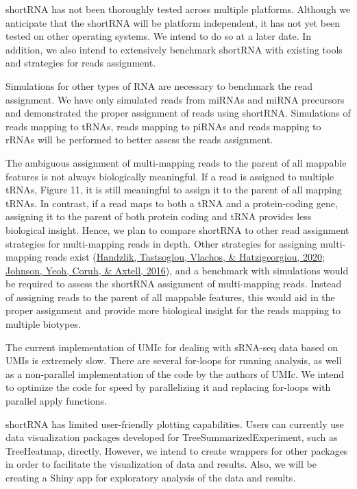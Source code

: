 \documentclass[12pt,twoside]{reedthesis}
\begin{document}
shortRNA has not been thoroughly tested across multiple platforms.
Although we anticipate that the shortRNA will be platform independent,
it has not yet been tested on other operating systems. We intend to do
so at a later date. In addition, we also intend to extensively benchmark
shortRNA with existing tools and strategies for reads assignment.

Simulations for other types of RNA are necessary to benchmark the read
assignment. We have only simulated reads from miRNAs and miRNA
precursors and demonstrated the proper assignment of reads using
shortRNA. Simulations of reads mapping to tRNAs, reads mapping to piRNAs
and reads mapping to rRNAs will be performed to better assess the reads
assignment.

The ambiguous assignment of multi-mapping reads to the parent of all
mappable features is not always biologically meaningful. If a read is
assigned to multiple tRNAs, Figure 11, it is still meaningful to assign
it to the parent of all mapping tRNAs. In contrast, if a read maps to
both a tRNA and a protein-coding gene, assigning it to the parent of
both protein coding and tRNA provides less biological insight. Hence, we
plan to compare shortRNA to other read assignment strategies for
multi-mapping reads in depth. Other strategies for assigning
multi-mapping reads exist (\protect\hyperlink{ref-handzlik2020}{Handzlik, Tastsoglou, Vlachos, \& Hatzigeorgiou, 2020}; \protect\hyperlink{ref-johnson2016}{Johnson, Yeoh, Coruh, \& Axtell, 2016}), and a benchmark
with simulations would be required to assess the shortRNA assignment of
multi-mapping reads. Instead of assigning reads to the parent of all
mappable features, this would aid in the proper assignment and provide
more biological insight for the reads mapping to multiple biotypes.

The current implementation of UMIc for dealing with sRNA-seq data based
on UMIs is extremely slow. There are several for-loops for running
analysis, as well as a non-parallel implementation of the code by the
authors of UMIc. We intend to optimize the code for speed by
parallelizing it and replacing for-loops with parallel apply functions.

shortRNA has limited user-friendly plotting capabilities. Users can
currently use data visualization packages developed for
TreeSummarizedExperiment, such as TreeHeatmap, directly. However, we
intend to create wrappers for other packages in order to facilitate the
visualization of data and results. Also, we will be creating a Shiny app
for exploratory analysis of the data and results.
\end{document}

